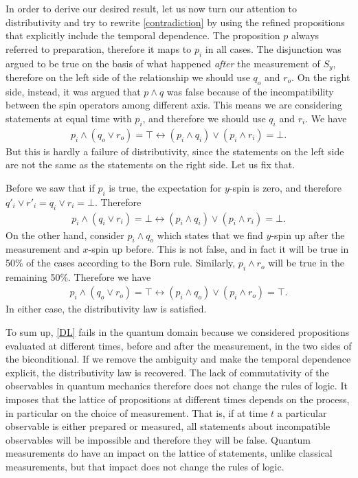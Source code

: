 \documentclass[11pt, executivepaper]{article}
\begin{document}
In order to derive our desired result, let us now turn our attention to distributivity and try to rewrite \eqref{contradiction} by using the refined propositions that explicitly include the temporal dependence. The proposition $p$ always referred to preparation, therefore it maps to $p_i$ in all cases. The disjunction was argued to be true on the basis of what happened \emph{after} the measurement of $S_y$, therefore on the left side of the relationship we should use $q_o$ and $r_o$. On the right side, instead, it was argued that $p \wedge q$ was false because of the incompatibility between the spin operators among different axis. This means we are considering statements at equal time with $p_i$, and therefore we should use $q_i$ and $r_i$. We have 
\begin{align}
	\label{solved_contradiction}
	p_i \wedge (q_o \vee r_o) = \top \longleftrightarrow (p_i \wedge q_i) \vee (p_i\wedge r_i) = \bot.
\end{align}
\noindent But this is hardly a failure of distributivity, since the statements on the left side are not the same as the statements on the right side. Let us fix that.

Before we saw that if $p_i$ is true, the expectation for $y$-spin is zero, and therefore $q'_i \vee r'_i = q_i \vee r_i = \bot$. Therefore
\begin{align}
	\label{solved_distrib_1}
	p_i \wedge (q_i \vee r_i) = \bot \longleftrightarrow (p_i \wedge q_i) \vee (p_i\wedge r_i) = \bot.
\end{align}
\noindent On the other hand, consider $p_i \wedge q_o$ which states that we find $y$-spin up after the measurement and $x$-spin up before. This is not false, and in fact it will be true in 50\% of the cases according to the Born rule. Similarly, $p_i \wedge r_o$ will be true in the remaining 50\%. Therefore we have
\begin{align}
	\label{solved_distrib_2}
	p_i \wedge (q_o \vee r_o) = \top \longleftrightarrow (p_i \wedge q_o) \vee (p_i\wedge r_o) = \top.
\end{align}
\noindent In either case, the distributivity law is satisfied.

To sum up, \eqref{DL} fails in the quantum domain because we considered propositions evaluated at different times, before and after the measurement, in the two sides of the biconditional. If we remove the ambiguity and make the temporal dependence explicit, the distributivity law is recovered. The lack of commutativity of the observables in quantum mechanics therefore does not change the rules of logic. It imposes that the lattice of propositions at different times depends on the process, in particular on the choice of measurement. That is, if at time $t$ a particular observable is either prepared or measured, all statements about incompatible observables will be impossible and therefore they will be false. Quantum measurements do have an impact on the lattice of statements, unlike classical measurements, but that impact does not change the rules of logic.
\end{document}
